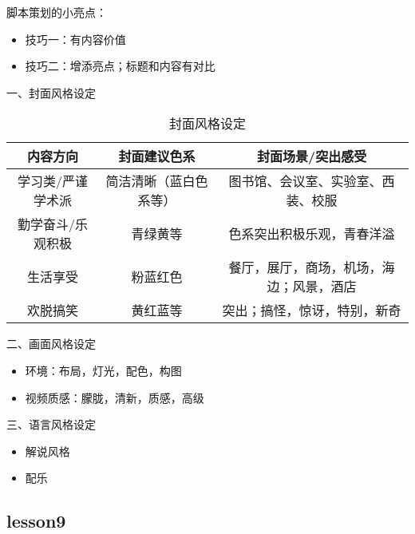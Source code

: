 \documentclass{book}
\begin{document}
脚本策划的小亮点：\begin{itemize}
           \item 技巧一：有内容价值
           \item 技巧二：增添亮点；标题和内容有对比
         \end{itemize}

一、封面风格设定

\begin{table}[h]
\caption{封面风格设定}
  \centering
\renewcommand\arraystretch{2}
\begin{tabular}{|c|c|c|}
  \hline
  内容方向&封面建议色系&封面场景/突出感受\\
  \hline
  学习类/严谨学术派&简洁清晰（蓝白色系等）&图书馆、会议室、实验室、西装、校服\\
  \hline
  勤学奋斗/乐观积极&青绿黄等&色系突出积极乐观，青春洋溢\\
  \hline
  生活享受&粉蓝红色&餐厅，展厅，商场，机场，海边；风景，酒店\\
  \hline
  欢脱搞笑&黄红蓝等&突出；搞怪，惊讶，特别，新奇\\
  \hline
\end{tabular}
\end{table}

二、画面风格设定\begin{itemize}
          \item 环境：布局，灯光，配色，构图
          \item 视频质感：朦胧，清新，质感，高级
        \end{itemize}

三、语言风格设定\begin{itemize}
          \item 解说风格
          \item 配乐
        \end{itemize}

\subsection{lesson9}

\begin{table}[h]
\caption{拍摄技巧}
  \centering
{}
\end{table}
\end{document}
